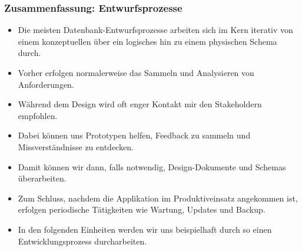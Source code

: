 \documentclass[aspectratio=169,mathserif,notheorems]{beamer}%
\begin{document}
\begin{frame}%
\frametitle{Zusammenfassung: Entwurfsprozesse}%
\begin{itemize}%
%
\item Die meisten Datenbank-Entwurfsprozesse arbeiten sich im Kern iterativ von einem konzeptuellen über ein logisches hin zu einem physischen Schema durch.%
%
\item<2-> Vorher erfolgen normalerweise das Sammeln und Analysieren von Anforderungen.%
%
\item<3-> Während dem Design wird oft enger Kontakt mir den Stakeholdern empfohlen.%
%
\item<4-> Dabei können uns Prototypen helfen, Feedback zu sammeln und Missverständnisse zu entdecken.%
%
\item<5-> Damit können wir dann, falls notwendig, Design-Dokumente und Schemas überarbeiten.%
%
\item<6-> Zum Schluss, nachdem die Applikation im Produktiveinsatz angekommen ist, erfolgen periodische Tätigkeiten wie Wartung, Updates und Backup.%
%
\item<7-> In den folgenden Einheiten werden wir uns beispielhaft durch so einen Entwicklungsprozess durcharbeiten.%
\end{itemize}%
\end{frame}
%
\endPresentation%
\end{document}
